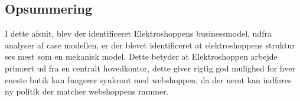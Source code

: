 \subsection{Opsummering}
I dette afsnit, blev  der identificeret Elektroshoppens businessmodel, udfra analyser af case modellen, er der blevet identificeret at elektroshoppens struktur ses mest som en mekanisk model. Dette betyder at Elektroshoppen arbejde primært ud fra en centralt hovedkontor, dette giver rigtig god mulighed for hver eneste butik kan fungerer synkront med webshoppen, da der nemt kan indføres ny politik der matcher webshoppens rammer.

